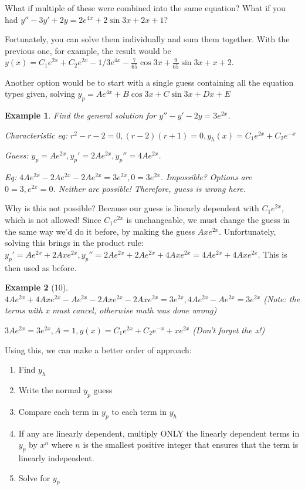 \documentclass{article}
\newtheorem{example}{Example}
\begin{document}
What if multiple of these were combined into the same equation? What if you had $y''-3y'+2y=2e^{4x}+2\sin{3x}+2x+1$?

Fortunately, you can solve them individually and sum them together. With the previous one, for example, the result would be $y(x)=C_1e^{2x}+C_2e^{2x}-1/3 e^{4x}-\frac{7}{65}\cos{3x}+\frac{9}{65}\sin{3x}+x+2$.

Another option would be to start with a single guess containing all the equation types given, solving $y_p = Ae^{4x}+B\cos{3x}+C\sin{3x}+Dx+E$

\begin{example}
	Find the general solution for $y''-y'-2y=3e^{2x}$.

	Characteristic eq: $r^2-r-2=0, (r-2)(r+1)=0, y_h(x)=C_1e^{2x}+C_2e^{-x}$

	Guess: $y_p=Ae^{2x}, y_p'=2Ae^{2x}, y_p''=4Ae^{2x}$. 

	Eq: $4Ae^{2x}-2Ae^{2x}-2Ae^{2x}=3e^{2x}, 0=3e^{2x}$. Impossible? Options are $0=3, e^{2x}=0$. Neither are possible! Therefore, guess is wrong here.
\end{example}

Why is this not possible? Because our guess is linearly dependent with $C_1e^{2x}$, which is not allowed! Since $C_1e^{2x}$ is unchangeable, we must change the guess in the same way we'd do it before, by making the guess $Axe^{2x}$. Unfortunately, solving this brings in the product rule: $y_p'=Ae^{2x}+2Axe^{2x}, y_p''=2Ae^{2x}+2Ae^{2x}+4Axe^{2x}=4Ae^{2x}+4Axe^{2x}$. This is then used as before.

\begin{example}[10]
	$4Ae^{2x}+4Axe^{2x}-Ae^{2x}-2Axe^{2x}-2Axe^{2x}=3e^{2x}, 4Ae^{2x}-Ae^{2x}=3e^{2x}$ (Note: the terms with x must cancel, otherwise math was done wrong)

	$3Ae^{2x}=3e^{2x}, A=1, y(x)=C_1e^{2x}+C_2e^{-x}+xe^{2x}$ (Don't forget the x!)
\end{example}

Using this, we can make a better order of approach:

\begin{enumerate}
	\item Find $y_h$
	\item Write the normal $y_p$ guess
	\item Compare each term in $y_p$ to each term in $y_h$
	\item If any are linearly dependent, multiply ONLY the linearly dependent terms in $y_p$ by $x^n$ where $n$ is the smallest positive integer that ensures that the term is linearly independent.
	\item Solve for $y_p$
\end{enumerate}
\end{document}
